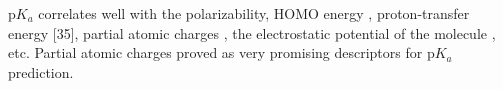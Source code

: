 p$K_a$ correlates well with the polarizability, HOMO energy \cite{Gross2001},
proton-transfer energy [35],
partial atomic charges \cite{Citra1999, Gross2002, Kreye2009, Svobodova2011},
the electrostatic potential of the molecule \cite{Liu2009}, etc.
Partial atomic charges proved as very promising
descriptors \cite{Citra1999, Gross2002, Kreye2009, Svobodova2011} for p$K_a$
prediction.


